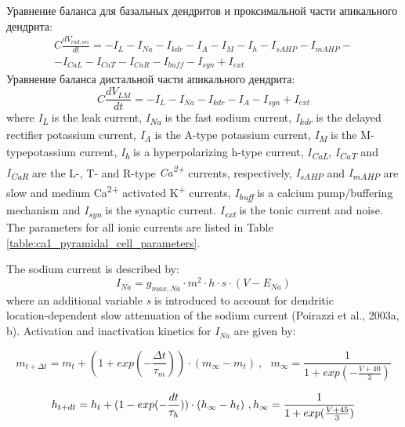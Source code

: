\documentclass[12pt]{article}
\begin{document}
Уравнение баланса для базальных дендритов и проксимальной части апикального дендрита:
\begin{eqnarray}
C\frac{dV_{rad,ori}}{dt} =-I_L-I_{Na}-I_{kdr}-I_A-I_M-I_h-I_{sAHP}-I_{mAHP}- \nonumber \\-I_{CaL}-I_{CaT}-I_{CaR}-I_{buff}-I_{syn}+I_{ext}
\end{eqnarray}
Уравнение баланса дистальной части апикального дендрита:
\begin{equation}
C\frac{dV_{LM}}{dt}=-I_L-I_{Na}-I_{kdr}-I_A-I_{syn}+I_{ext}
\end{equation}
where \textit{I\textsubscript{L}} is the leak current,  \textit{I\textsubscript{Na}} is the fast sodium current, \textit{I\textsubscript{kdr}} is the delayed rectifier potassium current, \textit{I\textsubscript{A}} is the A-type potassium current, \textit{I\textsubscript{M}}
is the M-typepotassium current, \textit{I\textsubscript{h}} is a hyperpolarizing h-type current,
\textit{I\textsubscript{CaL}}, \textit{I\textsubscript{CaT}} and
\textit{I\textsubscript{CaR}} are the L-, T- and R-type \textit{Ca\textsuperscript{2+}} currents, respectively,
\textit{I\textsubscript{sAHP}} and \textit{I\textsubscript{mAHP}} are
slow and medium Ca\textsuperscript{2+} activated K\textsuperscript{+} currents,\textit{ I\textsubscript{buff}}
is a calcium pump/buffering mechanism and \textit{I\textsubscript{syn}} is the synaptic current. \textit{ I\textsubscript{ext}} is the tonic current and noise. The
parameters for all ionic currents are listed in Table \ref{table:ca1_pyramidal_cell_parameters}. \par
The sodium current is described by:
\begin{equation}
I_{Na}= g_{max, Na}\cdot m^2\cdot h\cdot s\cdot (V-E_{Na})
\end{equation}
where an additional variable \textit{s} is introduced to account for dendritic location‑dependent slow attenuation of
the sodium current (Poirazzi et al., 2003a, b). Activation and inactivation kinetics for ${I_{Na}}$ are given by:


\begin{equation}
m_{t + \Delta t} = m_t+(1+exp(-\frac{\Delta t}{\tau_m}))\cdot
(m_{\infty}-m_t) \ , \ \ \  m_{\infty}=\frac {1}{1+exp(-\frac{V+40} {3})}
\end{equation}


\begin{equation}
h_{t+dt}=h_t+(1-exp(-\frac{dt}{\tau_h}))\cdot
(h_{\infty}-h_t) \ ,\\  h_{\infty}=\frac {1}{1+exp(\frac{V+45}{3})}
\end{equation}
\end{document}
